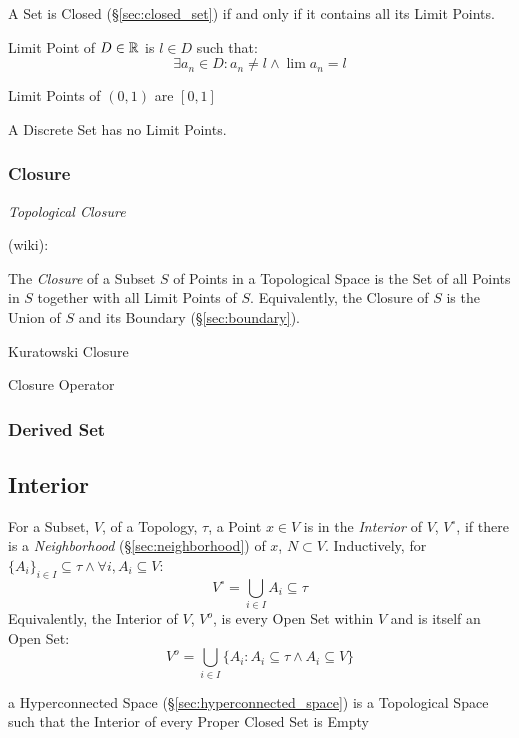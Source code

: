 A Set is Closed (\S\ref{sec:closed_set}) if and only if it contains all its
Limit Points.

Limit Point of $D \in \mathbb{R}$ is $l \in D$ such that:
\[
  \exists a_n \in D : a_n \neq l \wedge \lim a_n = l
\]

Limit Points of $(0,1)$ are $[0,1]$

A Discrete Set has no Limit Points. %



\subsubsection{Closure}\label{sec:topological_closure}

\emph{Topological Closure}

(wiki):

The \emph{Closure} of a Subset $S$ of Points in a Topological Space is the Set
of all Points in $S$ together with all Limit Points of $S$. Equivalently, the
Closure of $S$ is the Union of $S$ and its Boundary (\S\ref{sec:boundary}).

Kuratowski Closure

Closure Operator



\subsubsection{Derived Set}\label{sec:derived_set}



\subsection{Interior}\label{sec:interior}

For a Subset, $V$, of a Topology, $\tau$, a Point $x \in V$ is in the
\emph{Interior} of $V$, $V^{\circ}$, if there is a \emph{Neighborhood}
(\S\ref{sec:neighborhood}) of $x$, $N \subset V$. Inductively, for
$\{A_i\}_{i \in I} \subseteq \tau \wedge \forall i, A_i \subseteq V$:
\[
  V^{\circ} = \bigcup_{i \in I} A_i \subseteq \tau
\]
Equivalently, the Interior of $V$, $V^o$, is every Open Set within $V$
and is itself an Open Set:
\[
  V^o = \bigcup_{i \in I} \{ A_i : A_i \subseteq \tau \wedge A_i
  \subseteq V \}
\]

\fist a Hyperconnected Space (\S\ref{sec:hyperconnected_space}) is a
Topological Space such that the Interior of every Proper
Closed Set is Empty



